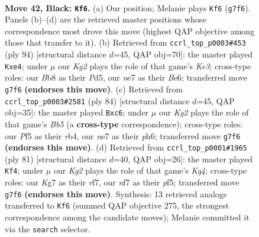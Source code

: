 \documentclass[11pt]{article}
\begin{document}
\clearpage

\begin{figure}[p]\centering
\begin{subfigure}{0.46\textwidth}\centering
\resizebox{\linewidth}{!}{%
\newchessgame
\chessboard[
  setfen={1b3r2/p3NNk1/P5P1/1P3p2/8/8/3K4/R1B5 b - - 4 42},
  showmover=false,
  pgfstyle=straightmove, color=movearrow, markmove={g7-f6}
]}
\caption{}
\end{subfigure}\hfill
\begin{subfigure}{0.46\textwidth}\centering
\resizebox{\linewidth}{!}{%
\newchessgame
\chessboard[
  setfen={8/8/rp1pB1k1/3P4/1P2pR2/4Kn1P/8/8 w - - 2 48},
  showmover=false,
  pgfstyle=straightmove, color=movearrow, markmove={e3-e4}
]}
\caption{}
\end{subfigure}
\\[4pt]
\begin{subfigure}{0.46\textwidth}\centering
\resizebox{\linewidth}{!}{%
\newchessgame
\chessboard[
  setfen={7k/1p4b1/1BnR3p/1B6/1r2p3/8/6PP/6K1 w - - 3 43},
  showmover=false,
  pgfstyle=straightmove, color=movearrow, markmove={b5-c6}
]}
\caption{}
\end{subfigure}\hfill
\begin{subfigure}{0.46\textwidth}\centering
\resizebox{\linewidth}{!}{%
\newchessgame
\chessboard[
  setfen={8/5R2/p4p2/5Pk1/1r1NP1b1/7r/P2R1K2/8 b - - 0 41},
  showmover=false,
  pgfstyle=straightmove, color=movearrow, markmove={g5-f4}
]}
\caption{}
\end{subfigure}
\caption{\textbf{Move 42, Black: \texttt{Kf6}.} (a) Our position; Melanie plays \texttt{Kf6} (\texttt{g7f6}). Panels (b)--(d) are the retrieved master positions whose correspondence most drove this move (highest QAP objective among those that transfer to it). (b) Retrieved from \texttt{ccrl\_top\_p0003\#453} (ply 94) [structural distance $d$=45, QAP obj=70]: the master played \texttt{Kxe4}; under $\mu$ our \emph{Kg2} plays the role of that game's \emph{Ke3}; cross-type roles: our \emph{B}b8 as their \emph{P}d5, our \emph{n}e7 as their \emph{B}e6; transferred move \texttt{g7f6} \textbf{(endorses this move)}. (c) Retrieved from \texttt{ccrl\_top\_p0003\#2581} (ply 84) [structural distance $d$=45, QAP obj=35]: the master played \texttt{Bxc6}; under $\mu$ our \emph{Kg2} plays the role of that game's \emph{Bb5} (a \textbf{cross-type} correspondence); cross-type roles: our \emph{P}f5 as their \emph{r}b4, our \emph{n}e7 as their \emph{p}h6; transferred move \texttt{g7f6} \textbf{(endorses this move)}. (d) Retrieved from \texttt{ccrl\_top\_p0001\#1965} (ply 81) [structural distance $d$=40, QAP obj=26]: the master played \texttt{Kf4}; under $\mu$ our \emph{Kg2} plays the role of that game's \emph{Kg4}; cross-type roles: our \emph{K}g7 as their \emph{r}f7, our \emph{n}f7 as their \emph{p}f5; transferred move \texttt{g7f6} \textbf{(endorses this move)}. Synthesis: 13 retrieved analogs transferred to \texttt{Kf6} (summed QAP objective 275, the strongest correspondence among the candidate moves); Melanie committed it via the \texttt{search} selector.}
\label{fig:thought-m83}
\end{figure}
\end{document}
